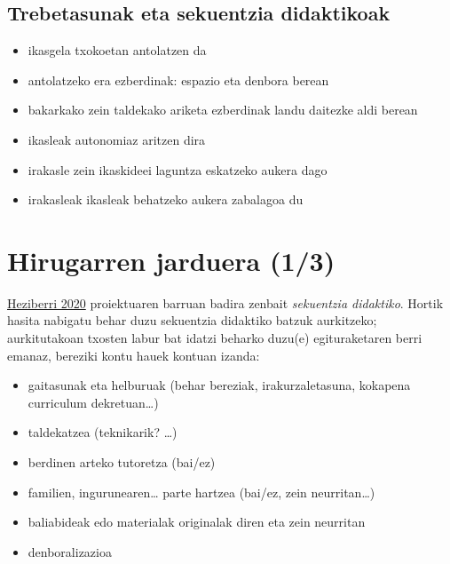 \documentclass[
]{book}
\providecommand{\tightlist}{%
  \setlength{\itemsep}{0pt}\setlength{\parskip}{0pt}}
\begin{document}
\hypertarget{trebetasunak-eta-sekuentzia-didaktikoak}{%
\section{Trebetasunak eta sekuentzia didaktikoak}\label{trebetasunak-eta-sekuentzia-didaktikoak}}

\begin{itemize}
\tightlist
\item
  ikasgela txokoetan antolatzen da
\item
  antolatzeko era ezberdinak: espazio eta denbora berean
\item
  bakarkako zein taldekako ariketa ezberdinak landu daitezke aldi berean
\item
  ikasleak autonomiaz aritzen dira
\item
  irakasle zein ikaskideei laguntza eskatzeko aukera dago
\item
  irakasleak ikasleak behatzeko aukera zabalagoa du
\end{itemize}

\hypertarget{hirugarren-jarduera-13}{%
\chapter*{Hirugarren jarduera (1/3)}\label{hirugarren-jarduera-13}}

\href{http://heziberri.berritzegunenagusia.eus/heziberri_eus/}{Heziberri 2020} proiektuaren barruan badira zenbait \emph{sekuentzia didaktiko}. Hortik hasita nabigatu behar duzu sekuentzia didaktiko batzuk aurkitzeko; aurkitutakoan txosten labur bat idatzi beharko duzu(e) egituraketaren berri emanaz, bereziki kontu hauek kontuan izanda:

\begin{itemize}
\tightlist
\item
  gaitasunak eta helburuak (behar bereziak, irakurzaletasuna, kokapena curriculum dekretuan\ldots)
\item
  taldekatzea (teknikarik? \ldots)
\item
  berdinen arteko tutoretza (bai/ez)
\item
  familien, ingurunearen\ldots{} parte hartzea (bai/ez, zein neurritan\ldots)
\item
  baliabideak edo materialak originalak diren eta zein neurritan
\item
  denboralizazioa
\end{itemize}
\end{document}
